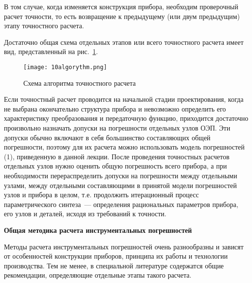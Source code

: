 В том случае, когда изменяется конструкция прибора, необходим проверочный расчет точности, то есть возвращение к предыдущему (или двум предыдущим) этапу точностного расчета.

Достаточно общая схема отдельных этапов или всего точностного расчета имеет вид, представленный на рис.~\ref{pic:10algorythm}.

\begin{figure}[h!]
	\caption{ Схема алгоритма точностного расчета }
	\texttt{[image: 10algorythm.png]}
	\label{pic:10algorythm}
\end{figure}

Если точностный расчет проводится на начальной стадии проектирования, когда не выбрана окончательно структура прибора и невозможно определить его характеристику преобразования и передаточную функцию, приходится достаточно произвольно назначать допуски на погрешности отдельных узлов ОЭП. Эти допуски обычно включают в себя большинство составляющих общей погрешности, поэтому для их расчета можно использовать модель погрешностей (1), приведенную в данной лекции. После проведения точностных расчетов отдельных узлов нужно оценить общую погрешность всего прибора, а при необходимости перераспределить допуски на погрешности между отдельными узлами, между отдельными составляющими в принятой модели погрешностей узлов и прибора в целом, т.е. продолжить итерационный процесс параметрического синтеза~--- определения рациональных параметров прибора, его узлов и деталей, исходя из требований к точности.

\begin{flushleft}
\textbf{Общая методика расчета инструментальных погрешностей}
\end{flushleft}

Методы расчета инструментальных погрешностей очень разнообразны и зависят от особенностей конструкции приборов, принципа их работы и технологии производства. Тем не менее, в специальной литературе содержатся общие рекомендации, определяющие отдельные этапы такого расчета.

